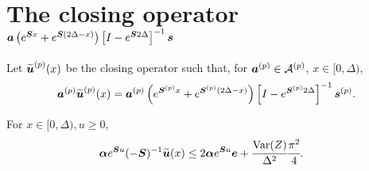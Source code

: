 \section{The closing operator \(\boldsymbol a  \left(e^{\boldsymbol{S} x} + e^{\boldsymbol{S} (2\Delta-x)}\right)\left[I-e^{\boldsymbol S  2\Delta}\right]^{-1}\boldsymbol s \)}

Let \(\widetilde{\boldsymbol u}^{(p)}(x)\) be the closing operator such that, for \(\boldsymbol a^{(p)} \in\mathcal A^{(p)}\), \(x\in[0,\Delta)\),
\[\boldsymbol a^{(p)} \widetilde{\boldsymbol u}^{(p)}(x) = \boldsymbol a^{(p)} \left(e^{\boldsymbol{S}^{(p)}x} + e^{\boldsymbol{S}^{(p)}(2\Delta-x)}\right)\left[I-e^{\boldsymbol S^{(p)} 2\Delta}\right]^{-1}\boldsymbol s^{(p)}.\]
\begin{lem}\label{lem: akxnj2}
	For \(x\in[0,\Delta),u\geq 0\),  
        \begin{align*}
        		\boldsymbol \alpha   e^{\boldsymbol Su}(-\boldsymbol S)^{-1} \widetilde{\boldsymbol u}(x) &\leq 2 \boldsymbol \alpha e^{\boldsymbol Su} \boldsymbol e + \cfrac{\mathrm{Var}(Z)}{\Delta^2}\cfrac{\pi^2}{4}.
	\end{align*}
\end{lem}
